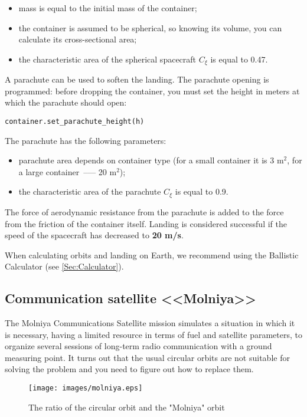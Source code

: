 \documentclass[12pt,a4paper]{article}
\begin{document}
\begin{itemize}
   \item mass is equal to the initial mass of the container;
   \item the container is assumed to be spherical, so knowing its volume, you can calculate its cross-sectional area;
   \item the characteristic area of the spherical spacecraft $C_{\xi}$ is equal to 0.47.
\end{itemize}

A parachute can be used to soften the landing. The parachute opening is programmed: before dropping the container, you must set the height in meters at which the parachute should open:

\begin{verbatim}
container.set_parachute_height(h)
\end{verbatim}

The parachute has the following parameters:

\begin{itemize}
\item parachute area depends on container type (for a small container it is 3 $\text{m}^2$, for a large container~--— 20 $\text{m}^2$);
\item the characteristic area of the parachute $C_{\xi}$ is equal to 0.9.
\end{itemize}

The force of aerodynamic resistance from the parachute is added to the force from the friction of the container itself.
Landing is considered successful if the speed of the spacecraft has decreased to \textbf{20 m/s}.

When calculating orbits and landing on Earth, we recommend using the Ballistic Calculator (see \ref{Sec:Calculator}).

\clearpage
\subsection{Communication satellite <<Molniya>>}

The Molniya Communications Satellite mission simulates a situation in which it is necessary, having a limited resource in terms of fuel and satellite parameters, to organize several sessions of long-term radio communication with a ground measuring point. It turns out that the usual circular orbits are not suitable for solving the problem and you need to figure out how to replace them.

\begin{figure}[tbh]
  \begin{center}
    \texttt{[image: images/molniya.eps]}
    \caption{The ratio of the circular orbit and the "Molniya" orbit}
    \label{Pic:Molniya}
  \end{center}
\end{figure}
\end{document}
